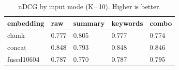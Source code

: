 \begin{table}
\caption{nDCG by input mode (K=10). Higher is better.}
\label{tab:ndcg-by-mode}
\begin{tabular}{lllll}
\toprule
embedding & raw & summary & keywords & combo \\
\midrule
chunk & 0.777 & 0.805 & 0.777 & 0.774 \\
concat & 0.848 & 0.793 & 0.848 & 0.846 \\
fused10604 & 0.787 & 0.770 & 0.787 & 0.795 \\
\bottomrule
\end{tabular}
\end{table}
